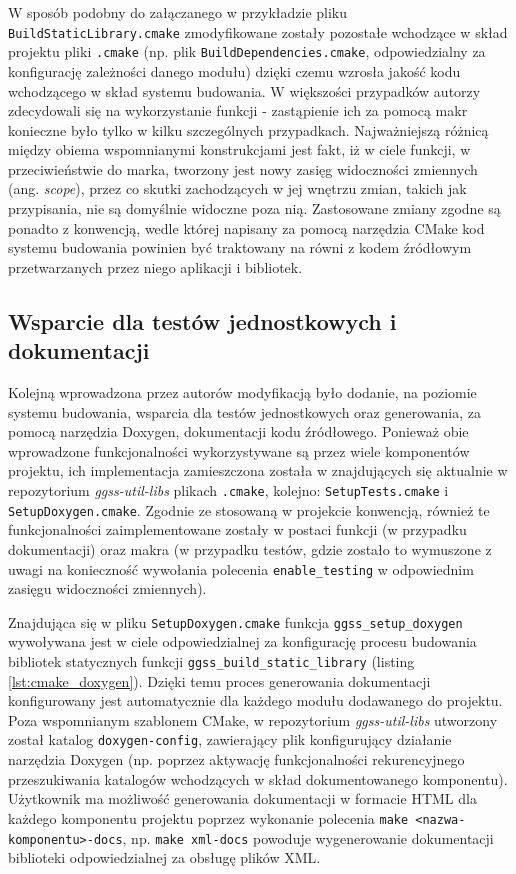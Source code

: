 W sposób podobny do załączanego w przykładzie pliku \lstinline{BuildStaticLibrary.cmake} zmodyfikowane zostały pozostałe wchodzące w skład projektu pliki \lstinline{.cmake} (np. plik \lstinline{BuildDependencies.cmake}, odpowiedzialny za konfigurację zależności danego modułu) dzięki czemu wzrosła jakość kodu wchodzącego w skład systemu budowania. W większości przypadków autorzy zdecydowali się na wykorzystanie funkcji - zastąpienie ich za pomocą makr konieczne było tylko w kilku szczególnych przypadkach. Najważniejszą różnicą między obiema wspomnianymi konstrukcjami jest fakt, iż w ciele funkcji, w przeciwieństwie do marka, tworzony jest nowy zasięg widoczności zmiennych (ang. \emph{scope}), przez co skutki zachodzących w jej wnętrzu zmian, takich jak przypisania, nie są domyślnie widoczne poza nią. Zastosowane zmiany zgodne są ponadto z konwencją, wedle której napisany za pomocą narzędzia CMake kod systemu budowania powinien być traktowany na równi z kodem źródłowym przetwarzanych przez niego aplikacji i bibliotek. 

\subsection{Wsparcie dla testów jednostkowych i dokumentacji}
Kolejną wprowadzona przez autorów modyfikacją było dodanie, na poziomie systemu budowania, wsparcia dla testów jednostkowych oraz generowania, za pomocą narzędzia Doxygen, dokumentacji kodu źródłowego. Ponieważ obie wprowadzone funkcjonalności wykorzystywane są przez wiele komponentów projektu, ich implementacja zamieszczona została w znajdujących się aktualnie w repozytorium \emph{ggss-util-libs} plikach \lstinline{.cmake}, kolejno: \lstinline{SetupTests.cmake} i \lstinline{SetupDoxygen.cmake}. Zgodnie ze stosowaną w projekcie konwencją, również te funkcjonalności zaimplementowane zostały w postaci funkcji (w przypadku dokumentacji) oraz makra (w przypadku testów, gdzie zostało to wymuszone z uwagi na konieczność wywołania polecenia \lstinline{enable_testing} w odpowiednim zasięgu widoczności zmiennych). 


Znajdująca się w pliku \lstinline{SetupDoxygen.cmake} funkcja \lstinline{ggss_setup_doxygen} wywoływana jest w ciele odpowiedzialnej za konfigurację procesu budowania bibliotek statycznych funkcji \lstinline{ggss_build_static_library} (listing \ref{lst:cmake_doxygen}). Dzięki temu proces generowania dokumentacji konfigurowany jest automatycznie dla każdego modułu dodawanego do projektu. Poza wspomnianym szablonem CMake, w repozytorium \emph{ggss-util-libs} utworzony został katalog \lstinline{doxygen-config}, zawierający plik konfigurujący działanie narzędzia Doxygen (np. poprzez aktywację funkcjonalności rekurencyjnego przeszukiwania katalogów wchodzących w skład dokumentowanego komponentu). Użytkownik ma możliwość generowania dokumentacji w formacie HTML dla każdego komponentu projektu poprzez wykonanie polecenia \lstinline{make <nazwa-komponentu>-docs}, np. \lstinline{make xml-docs} powoduje wygenerowanie dokumentacji biblioteki odpowiedzialnej za obsługę plików XML.

